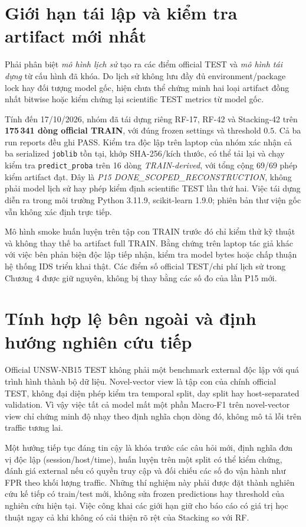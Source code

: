 \section{Giới hạn tái lập và kiểm tra artifact mới nhất}
Phải phân biệt \emph{mô hình lịch sử} tạo ra các điểm official TEST và \emph{mô hình tái dựng} từ cấu hình đã khóa. Do lịch sử không lưu đầy đủ environment/package lock hay đối tượng model gốc, hiện chưa thể chứng minh hai loại artifact đồng nhất bitwise hoặc kiểm chứng lại scientific TEST metrics từ model gốc.

Tính đến 17/10/2026, nhóm đã tái dựng riêng RF-17, RF-42 và Stacking-42 trên \textbf{175\,341 dòng official TRAIN}, với đúng frozen settings và threshold $0.5$. Cả ba run reports đều ghi PASS. Kiểm tra độc lập trên laptop của nhóm xác nhận cả ba serialized \texttt{joblib} tồn tại, khớp SHA-256/kích thước, có thể tải lại và chạy kiểm tra \texttt{predict\_proba} trên 16 dòng \emph{TRAIN-derived}, với tổng cộng 69/69 phép kiểm artifact đạt. Đây là \emph{P15 DONE\_SCOPED\_RECONSTRUCTION}, không phải model lịch sử hay phép kiểm định scientific TEST lần thứ hai. Việc tái dựng diễn ra trong môi trường Python 3.11.9, scikit-learn 1.9.0; phiên bản thư viện gốc vẫn không xác định trực tiếp.

Mô hình smoke huấn luyện trên tập con TRAIN trước đó chỉ kiểm thử kỹ thuật và không thay thế ba artifact full TRAIN. Bằng chứng trên laptop tác giả khác với việc bên phản biện độc lập tiếp nhận, kiểm tra model bytes hoặc chấp thuận hệ thống IDS triển khai thật. Các điểm số official TEST/chi phí lịch sử trong Chương 4 được giữ nguyên, không bị thay bằng các số đo của lần P15 mới.

\section{Tính hợp lệ bên ngoài và định hướng nghiên cứu tiếp}
Official UNSW-NB15 TEST không phải một benchmark external độc lập với quá trình hình thành bộ dữ liệu. Novel-vector view là tập con của chính official TEST, không đại diện phép kiểm tra temporal split, day split hay host-separated validation. Vì vậy việc tất cả model mất một phần Macro-F1 trên novel-vector view chỉ chứng minh độ nhạy theo định nghĩa chọn dòng đó, không mô tả lỗi trên traffic tương lai.

Một hướng tiếp tục đáng tin cậy là khóa trước các câu hỏi mới, định nghĩa đơn vị độc lập (session/host/time), huấn luyện trên một split có thể kiểm chứng, đánh giá external nếu có quyền truy cập và đối chiếu các số đo vận hành như FPR theo khối lượng traffic. Những thí nghiệm này phải được đặt thành nghiên cứu kế tiếp có train/test mới, không sửa frozen predictions hay threshold của nghiên cứu hiện tại. Việc công khai các giới hạn giữ cho báo cáo có giá trị học thuật ngay cả khi không có cải thiện rõ rệt của Stacking so với RF.

